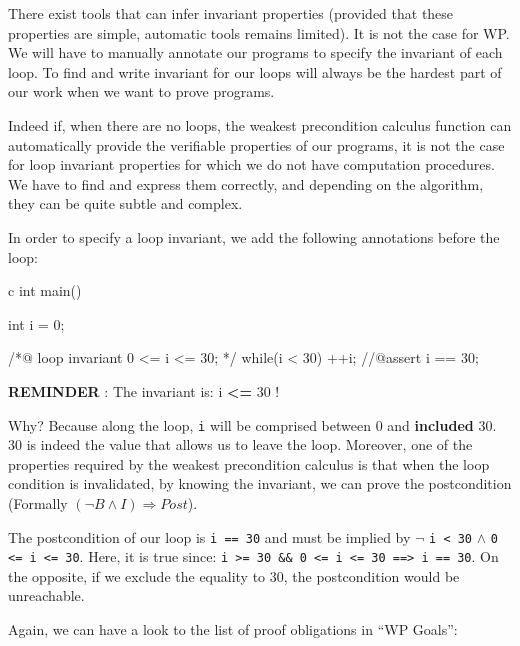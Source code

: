 \documentclass[middle]{zmdocument}
\begin{document}


There exist tools that can infer invariant properties (provided that
these properties are simple, automatic tools remains limited). It is not
the case for WP. We will have to manually annotate our programs to
specify the invariant of each loop. To find and write invariant for our
loops will always be the hardest part of our work when we want to prove
programs.



Indeed if, when there are no loops, the weakest precondition calculus
function can automatically provide the verifiable properties of our
programs, it is not the case for loop invariant properties for which we
do not have computation procedures. We have to find and express them
correctly, and depending on the algorithm, they can be quite subtle and
complex.



In order to specify a loop invariant, we add the following annotations
before the loop:



\begin{CodeBlock}{c}
int main(){
  int i = 0;
  
  /*@
    loop invariant 0 <= i <= 30;
  */
  while(i < 30){
    ++i;
  }
  //@assert i == 30;
}
\end{CodeBlock}



\begin{Warning}
  \textbf{REMINDER} : The invariant is: i \textbf{<=} 30 !
\end{Warning}


Why? Because along the loop, \texttt{i} will be comprised between 0 and
\textbf{included} 30. 30 is indeed the value that allows us to leave the
loop. Moreover, one of the properties required by the weakest
precondition calculus is that when the loop condition is invalidated, by
knowing the invariant, we can prove the postcondition (Formally
$(\neg B \wedge I) \Rightarrow Post$).

The postcondition of our loop is \texttt{i == 30} and must be implied
by $\neg$ \texttt{i < 30} $\wedge$
\texttt{0 <= i <= 30}. Here, it is true since:
\texttt{i >= 30 \&\& 0 <= i <= 30 ==> i == 30}.
On the opposite, if we exclude the equality to 30, the postcondition
would be unreachable.



Again, we can have a look to the list of proof obligations in ``WP
Goals'':
\end{document}

